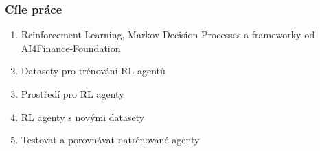 





\begin{frame}
    \frametitle{Cíle práce}
    \begin{enumerate}
        \itemsep1em
        \item Reinforcement Learning, Markov Decision Processes a frameworky od AI4Finance-Foundation
        \item Datasety pro trénování RL agentů
        \item Prostředí pro RL agenty
        \item RL agenty s novými datasety
        \item Testovat a porovnávat natrénované agenty
    \end{enumerate}
\end{frame}

